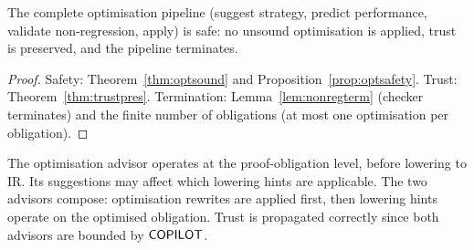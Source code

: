 \documentclass[11pt]{article}
\begin{document}
\begin{proposition}%
\label{prop:optpipelinesafe}
The complete optimisation pipeline (suggest strategy, predict
performance, validate non-regression, apply) is safe: no
unsound optimisation is applied, trust is preserved, and
the pipeline terminates.
\end{proposition}
\begin{proof}
Safety: Theorem~\ref{thm:optsound} and Proposition~\ref{prop:optsafety}.
Trust: Theorem~\ref{thm:trustpres}.
Termination: Lemma~\ref{lem:nonregterm} (checker terminates) and
the finite number of obligations (at most one optimisation per
obligation).
\end{proof}

\begin{remark}
The optimisation advisor operates at the proof-obligation level,
before lowering to IR.  Its suggestions may affect which lowering
hints are applicable.  The two advisors compose: optimisation
rewrites are applied first, then lowering hints operate on the
optimised obligation.  Trust is propagated correctly since both
advisors are bounded by $\mathsf{COPILOT}$.
\end{remark}
\end{document}
